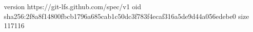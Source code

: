 version https://git-lfs.github.com/spec/v1
oid sha256:2f8a8f14800fbcb1796a685cab1c50dc3f783f4ecaf316a5de9d44a056edebe0
size 117116
